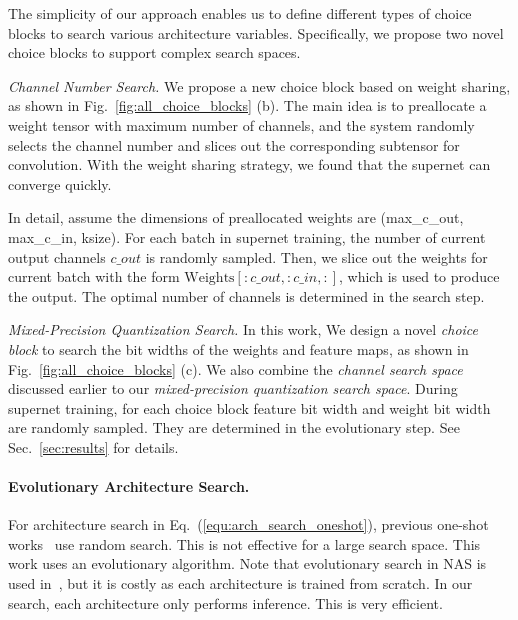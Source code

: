 The simplicity of our approach enables us to define different types of choice blocks to search various architecture variables. Specifically, we propose two novel choice blocks to support complex search spaces.

\emph{Channel Number Search. } We propose a new choice block based on weight sharing, as shown in Fig.~\ref{fig:all_choice_blocks} (b). The main idea is to preallocate a weight tensor with maximum number of channels, and the system randomly selects the channel number and slices out the corresponding subtensor for convolution. With the weight sharing strategy, we found that the supernet can converge quickly.

In detail, assume the dimensions of preallocated weights are (max\_c\_out, max\_c\_in, ksize). For each batch in supernet training, the number of current output channels $c\_out$ is randomly sampled. Then, we slice out the weights for current batch with the form $\mathrm{Weights}[:c\_out, :c\_in, :]$, which is used to produce the output. The optimal number of channels is determined in the search step.

\emph{Mixed-Precision Quantization Search. } In this work, We design a novel \emph{choice block} to search the bit widths of the weights and feature maps, as shown in Fig.~\ref{fig:all_choice_blocks} (c). We also combine the \emph{channel search space} discussed earlier to our \emph{mixed-precision quantization search space}. During supernet training, for each choice block feature bit width and weight bit width are randomly sampled. They are determined in the evolutionary step. See Sec.~\ref{sec:results} for details.

\paragraph{Evolutionary Architecture Search. } For architecture search in Eq.~(\ref{equ:arch_search_oneshot}), previous one-shot works~\cite{brock2017smash,bender2018understanding} use random search. This is not effective for a large search space. This work uses an evolutionary algorithm. Note that evolutionary search in NAS is used in~\cite{real2018regularized}, but it is costly as each architecture is trained from scratch. In our search, each architecture only performs inference. This is very efficient.

